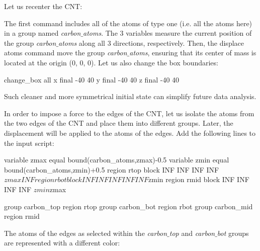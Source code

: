 \noindent Let us recenter the CNT:


\noindent The first command includes all of the atoms of type one
(i.e. all the atoms here) in a group named \textit{carbon$\_$atoms}. 
The 3 variables measure the current position of the group \textit{carbon$\_$atoms}
along all 3 directions, respectively. Then, the displace atoms 
command move the group \textit{carbon$\_$atoms}, ensuring that its center of mass 
is located at the origin (0, 0, 0).
Let us also change the box boundaries:

\begin{lcverbatim}
change_box all x final -40 40 y final -40 40 z final -40 40
\end{lcverbatim}

\noindent \begin{tcolorbox}[colback=mylightblue!5!white,colframe=mylightblue!75!black,title=Note]
Such cleaner and more symmetrical initial state can simplify
future data analysis.
\end{tcolorbox}

\noindent In order to impose a force to the edges of the CNT, let us isolate the
atoms from the two edges of the CNT and place them into different groups.
Later, the displacement will be applied to the atoms of the edges.
Add the following lines to the input script:

\begin{lcverbatim}
variable zmax equal bound(carbon_atoms,zmax)-0.5
variable zmin equal bound(carbon_atoms,zmin)+0.5
region rtop block INF INF INF INF ${zmax} INF
region rbot block INF INF INF INF INF ${zmin}
region rmid block INF INF INF INF ${zmin} ${zmax}
\end{lcverbatim}

\noindent \begin{lcverbatim}
group carbon_top region rtop
group carbon_bot region rbot
group carbon_mid region rmid
\end{lcverbatim}

\noindent The atoms of the edges as selected within the \textit{carbon$\_$top} and \textit{carbon$\_$bot} groups 
are represented with a different color:

